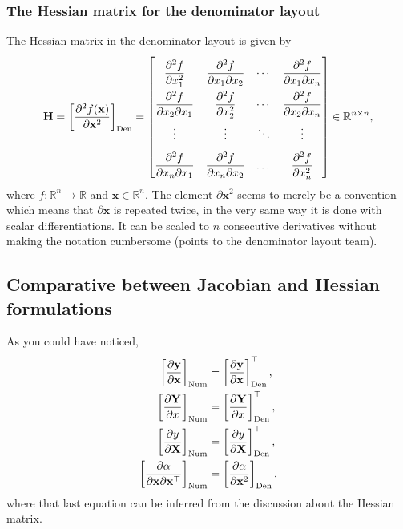 \documentclass{article}
\newcommand{\trans}{\top}
\begin{document}
\subsubsection{The Hessian matrix for the denominator layout}
The Hessian matrix in the denominator layout is given by
\begin{align}
    \label{eq:hessian-eq-denomintor}
    \mathbf{H} = \left[ \dfrac{\partial^{2} f(\mathbf{x})}{\partial \mathbf{x}^2} \right]_{\textnormal{Den}} = \renewcommand{\arraystretch}{2.2}\begin{bmatrix}
        \dfrac{\partial^{2} f}{\partial x_1^2} & \dfrac{\partial^{2} f}{\partial x_1 \partial x_2} & \cdots & \dfrac{\partial^{2} f}{\partial x_1 \partial x_n} \\
        \dfrac{\partial^{2} f}{\partial x_2 \partial x_1} & \dfrac{\partial^{2} f}{\partial x_2^2} & \cdots & \dfrac{\partial^{2} f}{\partial x_2 \partial x_n} \\
        \vdots & \vdots & \ddots & \vdots \\
        \dfrac{\partial^{2} f}{\partial x_n \partial x_1} & \dfrac{\partial^{2} f}{\partial x_n \partial x_2} & \dots & \dfrac{\partial^{2} f}{\partial x_n^2}
    \end{bmatrix} \in \mathbb{R}^{n \times n},
\end{align}
where \(f: \mathbb{R}^{n} \rightarrow \mathbb{R}\) and \(\mathbf{x} \in \mathbb{R}^{n}\). The element \(\partial\mathbf{x}^2\) seems to merely be a convention which means that \(\partial\mathbf{x}\) is repeated twice, in the very same way it is done with scalar differentiations. It can be scaled to \(n\) consecutive derivatives without making the notation cumbersome (points to the denominator layout team).

\subsection{Comparative between Jacobian and Hessian formulations}

As you could have noticed,
\begin{align}
    \left[ \dfrac{\partial \mathbf{y}}{\partial \mathbf{x}} \right]_{\textnormal{Num}} & = \left[ \dfrac{\partial \mathbf{y}}{\partial \mathbf{x}} \right]_{\textnormal{Den}}^{\trans}, \\
    \left[ \dfrac{\partial \mathbf{Y}}{\partial x}\right]_{\textnormal{Num}} & = \left[ \dfrac{\partial \mathbf{Y}}{\partial x}\right]_{\textnormal{Den}}^{\trans}, \\
    \left[\dfrac{\partial y}{\partial \mathbf{X}}\right]_{\textnormal{Num}} & = \left[\dfrac{\partial y}{\partial \mathbf{X}}\right]_{\textnormal{Den}}^{\trans}, \\
    \left[\dfrac{\partial \alpha}{\partial \mathbf{x} \partial\mathbf{x}^\top}\right]_{\textnormal{Num}} & = \left[\dfrac{\partial \alpha}{\partial \mathbf{x}^{2}}\right]_{\textnormal{Den}},
\end{align}
where that last equation can be inferred from the discussion about the Hessian matrix.
\end{document}
